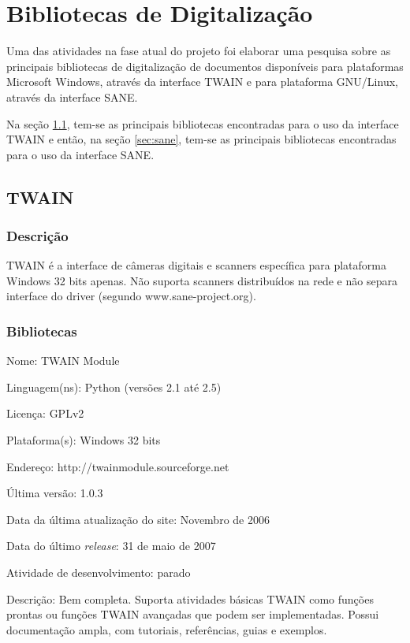 \section{Bibliotecas de Digitalização}
\label{sec:pesquisa_libs}

Uma das atividades na fase atual do projeto foi elaborar uma pesquisa sobre as principais bibliotecas de digitalização de documentos disponíveis para plataformas Microsoft Windows, através da interface TWAIN e para plataforma GNU/Linux, através da interface SANE. 

Na seção \ref{sec:twain}, tem-se as principais bibliotecas encontradas para o uso da interface TWAIN e então, na seção \ref{sec:sane}, tem-se as principais bibliotecas encontradas para o uso da interface SANE.

\subsection{TWAIN}
\label{sec:twain}

\subsubsection{Descrição}
TWAIN é a interface de câmeras digitais e scanners específica para plataforma Windows 32 bits apenas. Não suporta scanners distribuídos na rede e não separa interface do driver (segundo www.sane-project.org).

\subsubsection{Bibliotecas}
\begin{description*}
	\item[Nome:] TWAIN Module
	\item[Linguagem(ns):] Python (versões 2.1 até 2.5)
	\item[Licença:] GPLv2
	\item[Plataforma(s):] Windows 32 bits
	\item[Endereço:] http://twainmodule.sourceforge.net
	\item[Última versão:] 1.0.3
	\item[Data da última atualização do site:] Novembro de 2006
	\item[Data do último {\it release}:] 31 de maio de 2007
	\item[Atividade de desenvolvimento:] parado
	\item[Descrição:] 
	Bem completa. Suporta atividades básicas TWAIN como funções prontas ou funções TWAIN avançadas que podem ser implementadas. Possui documentação ampla, com tutoriais, referências, guias e exemplos.
\end{description*}

